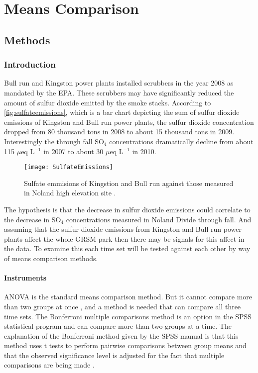 \chapter{Means Comparison}\label{ch:mc}

\section{Methods}

\subsection{Introduction}
Bull run and Kingston power plants installed scrubbers in the year 2008 as mandated by the EPA.
These scrubbers may have significantly reduced the amount of sulfur dioxide emitted by the smoke stacks.
According to \autoref{fig:sulfateemissions}, which is a bar chart depicting the sum of sulfur dioxide emissions of Kingston and Bull run power plants,  the sulfur dioxide concentration dropped from 80 thousand tons in 2008 to about 15 thousand tons in 2009.
Interestingly the through fall SO$_4$ concentrations dramatically decline from about 115 $\mu$eq L$^{-1}$ in 2007 to about 30 $\mu$eq L$^{-1}$ in 2010.

\begin{figure}[h!]
  \centering
  \texttt{[image: SulfateEmissions]}\\
  \caption{Sulfate emmisions of Kingstion and Bull run against those measured in Noland high elevation site \citep{annualreport2012}.}\label{fig:sulfateemissions}
\end{figure}
The hypothesis is that the decrease in sulfur dioxide emissions could correlate to the decrease in SO$_4$ concentrations measured in Noland Divide through fall.
And assuming that the sulfur dioxide emissions from Kingston and Bull run power plants affect the whole GRSM park then there may be signals for this affect in the data.
To examine this each time set will be tested against each other by way of means comparison methods.

\subsubsection{Instruments}
ANOVA is the standard means comparison method.
But it cannot compare more than two groups at once , and a method is needed that can compare all three time sets.
The Bonferroni multiple comparisons method is an option in the SPSS statistical program and can compare more than two groups at a time.
The explanation of the Bonferroni method given by the SPSS manual is that this method uses t tests to perform pairwise comparisons between group means and that the observed significance level is adjusted for the fact that multiple comparisons are being made \citep{spss}.

